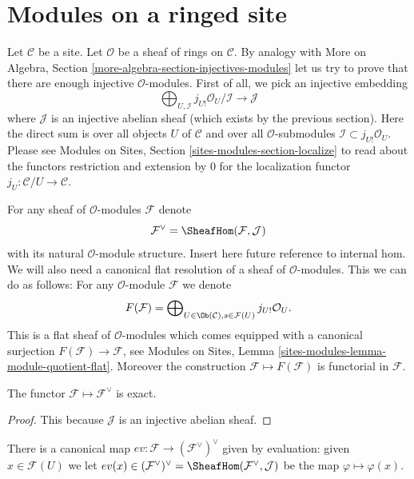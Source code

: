 \section{Modules on a ringed site}
\label{section-sheaves-modules}

\noindent
Let $\mathcal{C}$ be a site.
Let $\mathcal{O}$ be a sheaf of rings on $\mathcal{C}$.
By analogy with
More on Algebra, Section \ref{more-algebra-section-injectives-modules}
let us try to prove that there are enough injective
$\mathcal{O}$-modules. First of all, we pick an injective
embedding
$$
\bigoplus\nolimits_{U, \mathcal{I}}
j_{U!}\mathcal{O}_U/\mathcal{I}
\longrightarrow
\mathcal{J}
$$
where $\mathcal{J}$ is an injective abelian sheaf (which
exists by the previous section). Here the direct sum is
over all objects $U$ of $\mathcal{C}$ and over all
$\mathcal{O}$-submodules $\mathcal{I} \subset j_{U!}\mathcal{O}_U$.
Please see
Modules on Sites, Section \ref{sites-modules-section-localize}
to read about the functors restriction and
extension by $0$ for the localization functor
$j_U : \mathcal{C}/U \to \mathcal{C}$.

\medskip\noindent
For any sheaf of $\mathcal{O}$-modules $\mathcal{F}$ denote
$$
\mathcal{F}^\vee
=
\SheafHom(\mathcal{F}, \mathcal{J})
$$
with its natural $\mathcal{O}$-module structure.
Insert here future reference to internal hom.
We will also need
a canonical flat resolution of a sheaf of $\mathcal{O}$-modules.
This we can do as follows: For any $\mathcal{O}$-module
$\mathcal{F}$ we denote
$$
F(\mathcal{F})
=
\bigoplus\nolimits_{U \in \Ob(\mathcal{C}), s \in \mathcal{F}(U)}
j_{U!}\mathcal{O}_U.
$$
This is a flat sheaf of $\mathcal{O}$-modules which comes equipped
with a canonical surjection $F(\mathcal{F}) \to \mathcal{F}$, see
Modules on Sites, Lemma \ref{sites-modules-lemma-module-quotient-flat}.
Moreover the construction $\mathcal{F} \mapsto F(\mathcal{F})$
is functorial in $\mathcal{F}$.

\begin{lemma}
\label{lemma-vee-exact-sheaves}
The functor $\mathcal{F} \mapsto \mathcal{F}^\vee$ is exact.
\end{lemma}

\begin{proof}
This because $\mathcal{J}$ is an injective abelian sheaf.
\end{proof}

\noindent
There is a canonical map $ev : \mathcal{F} \to (\mathcal{F}^\vee)^\vee$
given by evaluation: given $x \in \mathcal{F}(U)$ we let
$ev(x) \in (\mathcal{F}^\vee)^\vee =
\SheafHom(\mathcal{F}^\vee, \mathcal{J})$
be the map $\varphi \mapsto \varphi(x)$.

